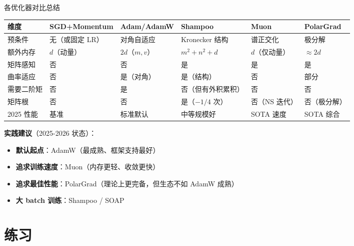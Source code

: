 \documentclass[aspectratio=169,10pt]{ctexbeamer}
\begin{document}
\begin{frame}{各优化器对比总结}
\begin{center}
\scriptsize
\begin{tabular}{p{1.6cm}p{2.2cm}p{2.2cm}p{2.2cm}p{2.2cm}p{2cm}}
\toprule
维度 & SGD+Momentum & Adam/AdamW & Shampoo & Muon & PolarGrad \\
\midrule
预条件 & 无（或固定 LR） & 对角自适应 & Kronecker 结构 & 谱正交化 & 极分解 \\
额外内存 & $d$（动量） & $2d$（$m,v$） & $m^2+n^2+d$ & $d$（仅动量） & $\approx2d$ \\
矩阵感知 & 否 & 否 & 是 & 是 & 是 \\
曲率适应 & 否 & 是（对角） & 是（结构） & 否 & 部分 \\
需要二阶矩 & 否 & 是 & 否（但有外积累积） & 否 & 否 \\
矩阵根 & 否 & 否 & 是（$-1/4$ 次） & 否（NS 迭代） & 否（极分解） \\
2025 性能 & 基准 & 标准默认 & 中等规模好 & SOTA 速度 & SOTA 综合 \\
\bottomrule
\end{tabular}
\end{center}

\vspace{0.3cm}
\textbf{实践建议}（2025-2026 状态）：
\begin{itemize}
  \item \textbf{默认起点}：AdamW（最成熟、框架支持最好）
  \item \textbf{追求训练速度}：Muon（内存更轻、收敛更快）
  \item \textbf{追求最佳性能}：PolarGrad（理论上更完备，但生态不如 AdamW 成熟）
  \item \textbf{大 batch 训练}：Shampoo / SOAP
\end{itemize}
\end{frame}

\section{练习}
\end{document}
